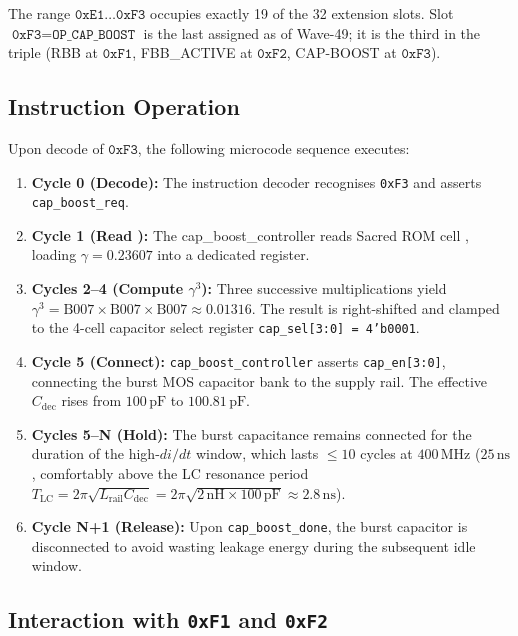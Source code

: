 \documentclass[12pt,a4paper]{report}
\theoremstyle{plain}
\theoremstyle{definition}
\theoremstyle{remark}
\newcommand{\Lrail}{L_{\mathrm{rail}}}
\newcommand{\Cdec}{C_{\mathrm{dec}}}
\newcommand{\Bseven}{\mathrm{B007}}
\begin{document}
The range $\texttt{0xE1}\ldots\texttt{0xF3}$ occupies exactly 19 of the
32 extension slots.
Slot $\texttt{0xF3} = \texttt{OP\_CAP\_BOOST}$ is the last assigned
as of Wave-49; it is the third in the triple
(RBB at $\texttt{0xF1}$, FBB\_ACTIVE at $\texttt{0xF2}$, CAP-BOOST at
$\texttt{0xF3}$).

\subsection{Instruction Operation}
\label{ssec:instruction-operation}

Upon decode of $\texttt{0xF3}$, the following microcode sequence executes:

\begin{enumerate}[leftmargin=1.5em]
  \item \textbf{Cycle 0 (Decode):} The instruction decoder recognises
    \texttt{0xF3} and asserts \texttt{cap\_boost\_req}.
  \item \textbf{Cycle 1 (Read \Bseven):}
    The cap\_boost\_controller reads Sacred ROM cell \Bseven,
    loading $\gamma = 0.23607$ into a dedicated register.
  \item \textbf{Cycles 2--4 (Compute $\gamma^{3}$):}
    Three successive multiplications yield
    $\gamma^{3} = \Bseven \times \Bseven \times \Bseven \approx 0.01316$.
    The result is right-shifted and clamped to the 4-cell capacitor select
    register \texttt{cap\_sel[3:0] = 4'b0001}.
  \item \textbf{Cycle 5 (Connect):}
    \texttt{cap\_boost\_controller} asserts \texttt{cap\_en[3:0]},
    connecting the burst MOS capacitor bank to the supply rail.
    The effective $\Cdec$ rises from $100\,\mathrm{pF}$ to $100.81\,\mathrm{pF}$.
  \item \textbf{Cycles 5--N (Hold):}
    The burst capacitance remains connected for the duration of the
    high-$di/dt$ window, which lasts $\leq 10$ cycles at $400\,\mathrm{MHz}$
    ($25\,\mathrm{ns}$, comfortably above the LC resonance period
    $T_{\mathrm{LC}} = 2\pi\sqrt{\Lrail \Cdec} = 2\pi\sqrt{2\,\mathrm{nH} \times 100\,\mathrm{pF}}
     \approx 2.8\,\mathrm{ns}$).
  \item \textbf{Cycle N+1 (Release):}
    Upon \texttt{cap\_boost\_done}, the burst capacitor is disconnected
    to avoid wasting leakage energy during the subsequent idle window.
\end{enumerate}

\subsection{Interaction with \texttt{0xF1} and \texttt{0xF2}}
\label{ssec:triple-interaction}
\end{document}
